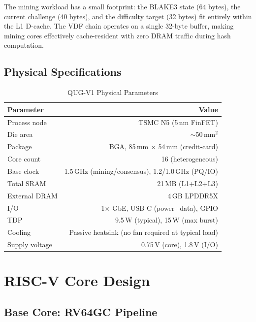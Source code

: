 \documentclass[11pt,a4paper]{article}
\begin{document}
The mining workload has a small footprint: the BLAKE3 state (64 bytes), the current challenge (40 bytes), and the difficulty target (32 bytes) fit entirely within the L1 D-cache. The VDF chain operates on a single 32-byte buffer, making mining cores effectively cache-resident with zero DRAM traffic during hash computation.

\subsection{Physical Specifications}

\begin{table}[H]
\centering
\caption{QUG-V1 Physical Parameters}
\begin{tabular}{@{}lr@{}}
\toprule
\textbf{Parameter} & \textbf{Value} \\
\midrule
Process node & TSMC N5 (5\,nm FinFET) \\
Die area & $\sim$50\,mm$^2$ \\
Package & BGA, 85\,mm $\times$ 54\,mm (credit-card) \\
Core count & 16 (heterogeneous) \\
Base clock & 1.5\,GHz (mining/consensus), 1.2/1.0\,GHz (PQ/IO) \\
Total SRAM & 21\,MB (L1+L2+L3) \\
External DRAM & 4\,GB LPDDR5X \\
I/O & 1$\times$ GbE, USB-C (power+data), GPIO \\
TDP & 9.5\,W (typical), 15\,W (max burst) \\
Cooling & Passive heatsink (no fan required at typical load) \\
Supply voltage & 0.75\,V (core), 1.8\,V (I/O) \\
\bottomrule
\end{tabular}
\end{table}

\section{RISC-V Core Design}
\label{sec:core}

\subsection{Base Core: RV64GC Pipeline}
\end{document}
